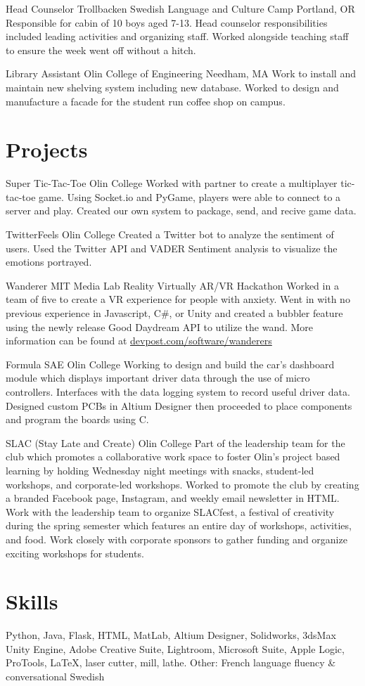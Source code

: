 \documentclass[11.5pt]{moderncv}
\begin{document}
{Head Counselor}
{Trollbacken Swedish Language and Culture Camp}
{Portland, OR}
{}
{Responsible for cabin of 10 boys aged 7-13. Head counselor responsibilities included leading activities and organizing staff. Worked alongside teaching staff to ensure the week went off without a hitch.}

{Library Assistant}
{Olin College of Engineering}
{Needham, MA}
{}
{Work to install and maintain new shelving system including new database. Worked to design and manufacture a facade for the student run coffee shop on campus.}

\vspace{0.05 in}
\section{Projects}

{Super Tic-Tac-Toe}
{Olin College}
{}
{}
{Worked with partner to create a multiplayer tic-tac-toe game. Using Socket.io and PyGame, players were able to connect to a server and play. Created our own system to package, send, and recive game data.}

{TwitterFeels}
{Olin College}
{}
{}
{Created a Twitter bot to analyze the sentiment of users. Used the Twitter API and VADER Sentiment analysis to visualize the emotions portrayed.}

{Wanderer}
{MIT Media Lab Reality Virtually AR/VR Hackathon}
{}
{}
{Worked in a team of five to create a VR experience for people with anxiety. Went in with no previous experience in Javascript, C\#, or Unity and created a bubbler feature using the newly release Good Daydream API to utilize the wand. More information can be found at \href{https://devpost.com/software/wanderers}{devpost.com/software/wanderers}}

{Formula SAE}
{Olin College}
{}
{}
{Working to design and build the car's dashboard module which displays important driver data through the use of micro controllers. Interfaces with the data logging system to record useful driver data. Designed custom PCBs in Altium Designer then proceeded to place components and program the boards using C.}

{SLAC (Stay Late and Create)}
{Olin College}
{}
{}
{Part of the leadership team for the club which promotes a collaborative work space to foster Olin's project based learning by holding Wednesday night meetings with snacks, student-led workshops, and corporate-led workshops. Worked to promote the club by creating a branded Facebook page, Instagram, and weekly email newsletter in HTML. Work with the leadership team to organize SLACfest, a festival of creativity during the spring semester which features an entire day of workshops, activities, and food. Work closely with corporate sponsors to gather funding and organize exciting  workshops for students.}

\section{Skills}

\cvline{}
{
Python,
Java,
Flask,
HTML,
MatLab,
Altium Designer,
Solidworks,
3dsMax
Unity Engine,
Adobe Creative Suite,
Lightroom,
Microsoft Suite,
Apple Logic,
ProTools,
\LaTeX{},
laser cutter,
mill,
lathe.
}
\cvline{}
{Other: French language fluency \& conversational Swedish}
\end{document}
